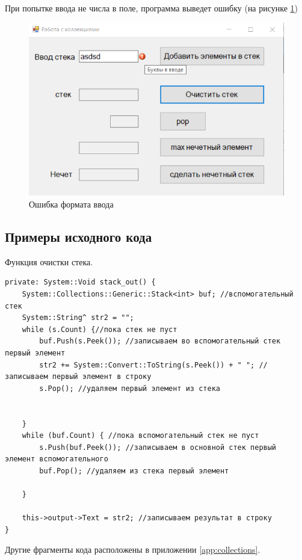 При попытке ввода не числа в поле, программа выведет ошибку (на рисунке \ref{task7_launch3})
\begin{figure}[H]
    \centering
    \includegraphics[width=0.8\linewidth]{lections/img/task7_launch3.png}
    \caption{Ошибка формата ввода}
    \label{task7_launch3}
\end{figure}



\subsection{Примеры исходного кода}


Функция очистки стека.
\begin{verbatim}
private: System::Void stack_out() {
	System::Collections::Generic::Stack<int> buf; //вспомогательный стек
	System::String^ str2 = "";
	while (s.Count) {//пока стек не пуст
		buf.Push(s.Peek()); //записываем во вспомогательный стек первый элемент
		str2 += System::Convert::ToString(s.Peek()) + " "; //записываем первый элемент в строку
		s.Pop(); //удаляем первый элемент из стека


	}
	while (buf.Count) { //пока вспомогательный стек не пуст
		s.Push(buf.Peek()); //записываем в основной стек первый элемент вспомогательного
		buf.Pop(); //удаляем из стека первый элемент

	}

	this->output->Text = str2; //записываем результат в строку
}
\end{verbatim}
Другие фрагменты кода расположены в приложении \ref{app:collections}.
\sectionbreak